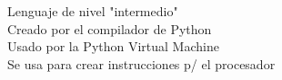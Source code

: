 \documentclass[preview]{standalone}
\begin{document}
Lenguaje de nivel "intermedio"\\Creado por el compilador de Python\\Usado por la Python Virtual Machine\\Se usa para crear instrucciones p/ el procesador\\
\end{document}
